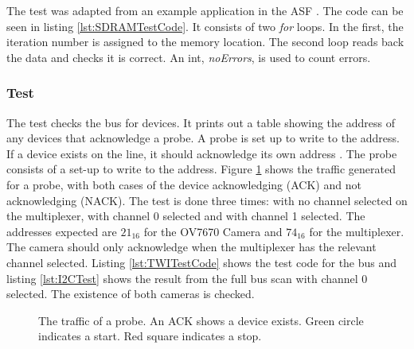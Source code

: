 The test was adapted from an example application in the ASF \citep{Atmel:ASF}. The code can be seen in listing \ref{lst:SDRAMTestCode}. It consists of two \textit{for} loops. In the first, the iteration number is assigned to the memory location. The second loop reads back the data and checks it is correct. An int, \textit{noErrors}, is used to count errors. 



\subsubsection{\itc Test}\label{I2C:Test}
The \itc test checks the bus for devices. It prints out a table showing the address of any devices that acknowledge a probe. A probe is set up to write to the address. If a device exists on the line, it should acknowledge its own address \citep{Philips:I2C}. The probe consists of a set-up to write to the address. Figure \ref{fig:I2C} shows the \itc traffic generated for a probe, with both cases of the device acknowledging (ACK) and not acknowledging (NACK). The test is done three times: with no channel selected on the \itc multiplexer, with channel 0 selected and with channel 1 selected. The addresses expected are $21_{16}$ for the OV7670 Camera and $74_{16}$ for the \itc multiplexer. The camera should only acknowledge when the \itc multiplexer has the relevant channel selected. Listing \ref{lst:TWITestCode} shows the test code for the \itc bus and listing \ref{lst:I2CTest} shows the result from the full bus scan with channel 0 selected. The existence of both cameras is checked. %
\begin{figure}
\caption{The \itc traffic of a probe. An ACK shows a device exists. Green circle indicates a start. Red square indicates a stop.}
\label{fig:I2C}
\end{figure}


